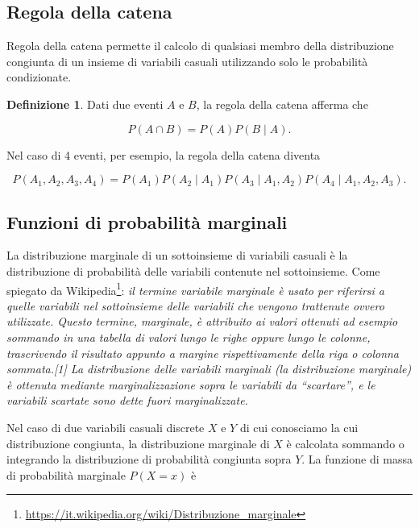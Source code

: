 \documentclass[
  11pt,
]{krantz}
\renewcommand{\href}[2]{#2\footnote{\url{#1}}}
\theoremstyle{definition}
\newtheorem{definition}{Definizione}[chapter]
\theoremstyle{definition}
\theoremstyle{definition}
\theoremstyle{definition}
\theoremstyle{remark}
\begin{document}
\hypertarget{regola-della-catena}{%
\subsection{Regola della catena}\label{regola-della-catena}}

Regola della catena permette il calcolo di qualsiasi membro della distribuzione congiunta di un insieme di variabili casuali utilizzando solo le probabilità condizionate.

\begin{definition}
Dati due eventi \(A\) e \(B\), la regola della catena afferma che

\[
P(A \cap B) = P(A)P(B \mid A).
\]
\end{definition}

Nel caso di 4 eventi, per esempio, la regola della catena diventa

\[
P(A_1, A_2, A_3, A_4) = P(A_1) P(A_2 \mid A_1) P(A_3 \mid A_1, A_2) P(A_4 \mid A_1, A_2, A_3).
\]

\hypertarget{funzioni-di-probabilituxe0-marginali}{%
\subsection{Funzioni di probabilità marginali}\label{funzioni-di-probabilituxe0-marginali}}

La distribuzione marginale di un sottoinsieme di variabili casuali è la distribuzione di probabilità delle variabili contenute nel sottoinsieme. Come spiegato da \href{https://it.wikipedia.org/wiki/Distribuzione_marginale}{Wikipedia}: \emph{il termine variabile marginale è usato per riferirsi a quelle variabili nel sottoinsieme delle variabili che vengono trattenute ovvero utilizzate. Questo termine, marginale, è attribuito ai valori ottenuti ad esempio sommando in una tabella di valori lungo le righe oppure lungo le colonne, trascrivendo il risultato appunto a margine rispettivamente della riga o colonna sommata.{[}1{]} La distribuzione delle variabili marginali (la distribuzione marginale) è ottenuta mediante marginalizzazione sopra le variabili da ``scartare'', e le variabili scartate sono dette fuori marginalizzate.}

Nel caso di due variabili casuali discrete \(X\) e \(Y\) di cui conosciamo la cui distribuzione congiunta, la distribuzione marginale di \(X\) è calcolata sommando o integrando la distribuzione di probabilità congiunta sopra \(Y\). La funzione di massa di probabilità marginale \(P(X=x)\) è
\end{document}

